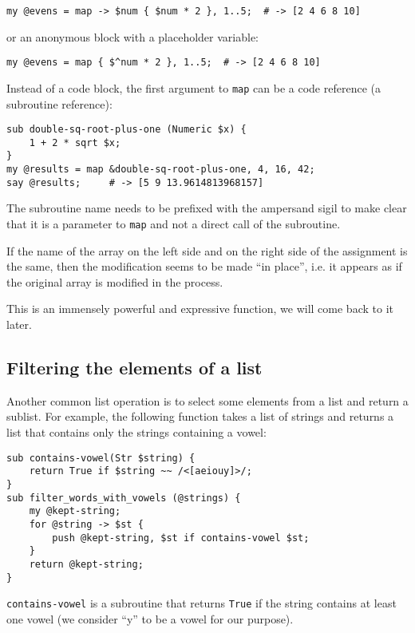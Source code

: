 \begin{verbatim}
my @evens = map -> $num { $num * 2 }, 1..5;  # -> [2 4 6 8 10]
\end{verbatim}
%

or an anonymous block with a placeholder variable:

\begin{verbatim}
my @evens = map { $^num * 2 }, 1..5;  # -> [2 4 6 8 10]
\end{verbatim}
%

Instead of a code block, the first argument to {\tt map} can 
be a code reference (a subroutine reference):

\begin{verbatim}
sub double-sq-root-plus-one (Numeric $x) { 
    1 + 2 * sqrt $x;
}
my @results = map &double-sq-root-plus-one, 4, 16, 42;
say @results;     # -> [5 9 13.9614813968157]
\end{verbatim}
%

The subroutine name needs to be prefixed with the ampersand 
sigil to make clear that it is a parameter to {\tt map} and 
not a direct call of the subroutine.

If the name of the array on the left side and on the right 
side of the assignment is the same, then the modification 
seems to be made ``in place'', i.e. it appears as if the original array is modified in the process.


This is an immensely 
powerful and expressive function, we will come back to it 
later.

\subsection{Filtering the elements of a list}

Another common list operation is to select some elements from
a list and return a sublist.  For example, the following
function takes a list of strings and returns a list that 
contains only the strings containing a vowel:

\begin{verbatim}
sub contains-vowel(Str $string) {
    return True if $string ~~ /<[aeiouy]>/;
}
sub filter_words_with_vowels (@strings) {
    my @kept-string;
    for @string -> $st { 
        push @kept-string, $st if contains-vowel $st;
    }
    return @kept-string;
}  
\end{verbatim}
%

{\tt contains-vowel} is a subroutine that returns 
{\tt True} if the string contains at least one vowel 
(we consider ``y'' to be a vowel for our purpose).

